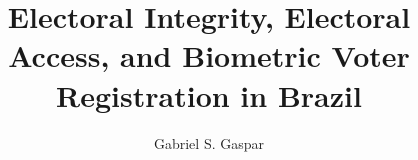 \title{Electoral Integrity, Electoral Access, and Biometric Voter Registration in Brazil}
\author[1]{Gabriel S. Gaspar}
\date{}
